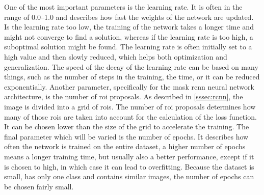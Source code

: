 One of the most important parameters is the learning rate.
It is often in the range of \SIrange{0.0}{1.0}{} and describes how fast the weights of the network are updated.
Is the learning rate too low, the training of the network takes a longer time and might not converge to find a solution, whereas if the learning rate is too high, a suboptimal solution might be found.
The learning rate is often initially set to a high value and then slowly reduced, which helps both optimization and generalization.
The speed of the decay of the learning rate can be based on many things, such as the number of steps in the training, the time, or it can be reduced exponentially.
Another parameter, specifically for the mask \gls{rcnn} neural network architecture, is the number of \gls{roi} proposals.
As described in \cref{sssec:rcnn}, the image is divided into a grid of \glspl{roi}.
The number of \gls{roi} proposals determines how many of those \glspl{roi} are taken into account for the calculation of the loss function.
It can be chosen lower than the size of the grid to accelerate the training.
The final parameter which will be varied is the number of epochs.
It describes how often the network is trained on the entire dataset, a higher number of epochs means a longer training time, but usually also a better performance, except if it is chosen to high, in which case it can lead to overfitting.
Because the dataset is small, has only one class and contains similar images, the number of epochs can be chosen fairly small.

